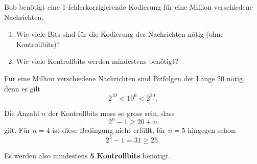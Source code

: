 \begin{myexercise}
	Bob benötigt eine 1-fehlerkorrigierende Kodierung
	für eine Million verschiedene Nachrichten.

	\begin{enumerate}
		\item Wie viele Bits sind für die Kodierung der
		      Nachrichten nötig (ohne Kontrollbits)?

		\item Wie viele Kontrollbits werden mindestens benötigt?
	\end{enumerate}
	\begin{myanswer}
		Für eine Million verschiedene Nachrichten sind Bitfolgen der
		Länge 20 nötig, denn es gilt
		\[
			2^{19} < 10^6 < 2^{20}.
		\]

		Die Anzahl \(n\) der Kontrollbits muss so gross sein, dass
		\[
			2^n-1 \geq 20+n
		\]
		gilt. Für \(n=4\) ist diese Bedingung nicht erfüllt, für
		\(n=5\) hingegen schon:
		\[
			2^5-1=31\geq 25.
		\]

		Es werden also mindestens \textbf{5 Kontrollbits} benötigt.
	\end{myanswer}
\end{myexercise}



